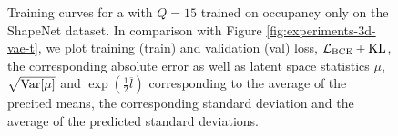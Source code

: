 \begin{figure}[b]
  \caption{Training curves for a \VAE with $Q = 15$ trained on occupancy only
  on the ShapeNet dataset. In comparison with Figure \ref{fig:experiments-3d-vae-t},
  we plot training (train) and validation (val) loss, \ie $\mathcal{L}_{\text{BCE}} + \mathrm{KL}$,
  the corresponding absolute error \Abs as well as latent space statistics
  $\overline{\mu}$, $\sqrt{\mathrm{Var}[\mu]}$ and $\exp(\frac{1}{2} \overline{l})$
  corresponding to the average of the precited means, the corresponding standard
  deviation and the average of the predicted standard deviations.}
  \label{fig:experiments-shapenet-vae-t}
\end{figure}

